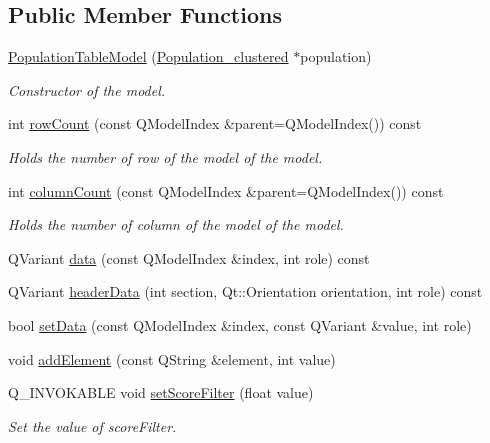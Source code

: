 \subsection*{Public Member Functions}
\begin{DoxyCompactItemize}
\item 
\hyperlink{class_population_table_model_adccce4753330371cd2d3ed12090f2709}{Population\+Table\+Model} (\hyperlink{class_population__clustered}{Population\+\_\+clustered} $\ast$population)
\begin{DoxyCompactList}\small\item\em Constructor of the model. \end{DoxyCompactList}\item 
int \hyperlink{class_population_table_model_adfbc59704ecc571dd6c79173c075a2f2}{row\+Count} (const Q\+Model\+Index \&parent=Q\+Model\+Index()) const
\begin{DoxyCompactList}\small\item\em Holds the number of row of the model of the model. \end{DoxyCompactList}\item 
int \hyperlink{class_population_table_model_a2f44c3e0b5e3c1d039b4c48c30e3ebdb}{column\+Count} (const Q\+Model\+Index \&parent=Q\+Model\+Index()) const
\begin{DoxyCompactList}\small\item\em Holds the number of column of the model of the model. \end{DoxyCompactList}\item 
Q\+Variant \hyperlink{class_population_table_model_ac76f82c4f4db0d3af2bff37b0e5700b7}{data} (const Q\+Model\+Index \&index, int role) const
\item 
Q\+Variant \hyperlink{class_population_table_model_a00fbcad901121f0635146227a96b1356}{header\+Data} (int section, Qt\+::\+Orientation orientation, int role) const
\item 
bool \hyperlink{class_population_table_model_a6cf9eae4078f090d7fbd0883bc0eaf06}{set\+Data} (const Q\+Model\+Index \&index, const Q\+Variant \&value, int role)
\item 
void \hyperlink{class_population_table_model_a8a54cdbc4dd1e296224e5c833a61c2ba}{add\+Element} (const Q\+String \&element, int value)
\item 
Q\+\_\+\+I\+N\+V\+O\+K\+A\+B\+LE void \hyperlink{class_population_table_model_a001b0d530f0cad81a919667a3b3575f8}{set\+Score\+Filter} (float value)
\begin{DoxyCompactList}\small\item\em Set the value of score\+Filter. \end{DoxyCompactList}\item 

\end{DoxyCompactItemize}
